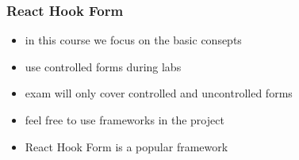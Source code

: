 \begin{frame}[fragile] \frametitle{React Hook Form}

\begin{itemize}
  \item in this course we focus on the basic consepts
  \item use controlled forms during labs
  \item exam will  only cover controlled and uncontrolled forms
  \item feel free to use frameworks in the project
  \item React Hook Form is a popular framework
\end{itemize}
\end{frame}



